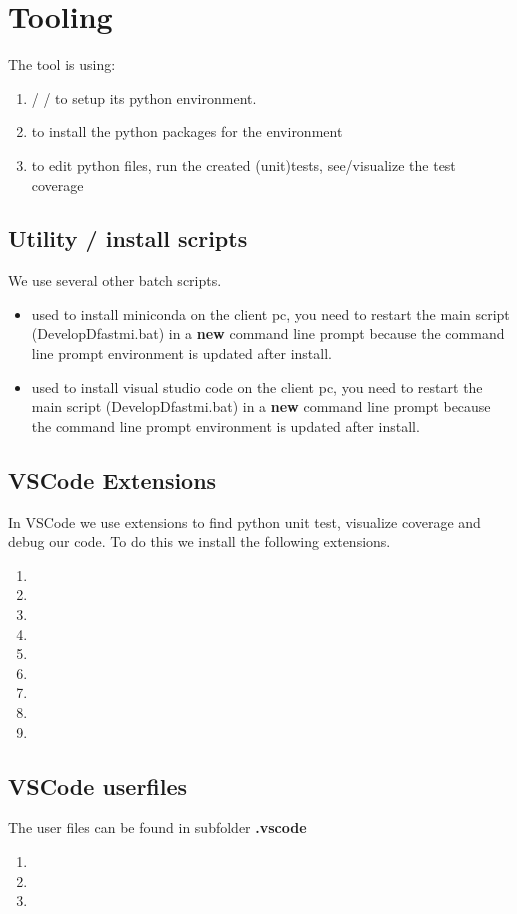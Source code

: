 \section{Tooling}
The tool is using:
\begin{enumerate}
\item {} /  / to setup its python environment. 
\item {} to install the python packages for the environment
\item {} to edit python files, run the created (unit)tests, see/visualize the test coverage
\end{enumerate}

\subsection{Utility / install scripts}
We use several other batch scripts.
\begin{itemize}
	\item {} used to install miniconda on the client pc, you need to restart the main script (DevelopDfastmi.bat) in a \textbf{new} command line prompt because the command line prompt environment is
	 updated after install.
	\item {} used to install visual studio code on the client pc, you need to restart the main script (DevelopDfastmi.bat) in a \textbf{new} command line prompt because the command line prompt environment is updated after install.
\end{itemize}

\subsection{VSCode Extensions}
In VSCode we use extensions to find python unit test, visualize coverage and debug our code. To do this we install the following extensions.
\begin{enumerate}
	\item {}
	\item {}
	\item {}
	\item {}
	\item {}
	\item {}
	\item {}
	\item {}
	\item {}
\end{enumerate}

\subsection{VSCode userfiles}
The user files can be found in subfolder \textbf{.vscode}
\begin{enumerate}
	\item {} 
	\item {} 
	\item {} 
\end{enumerate}

